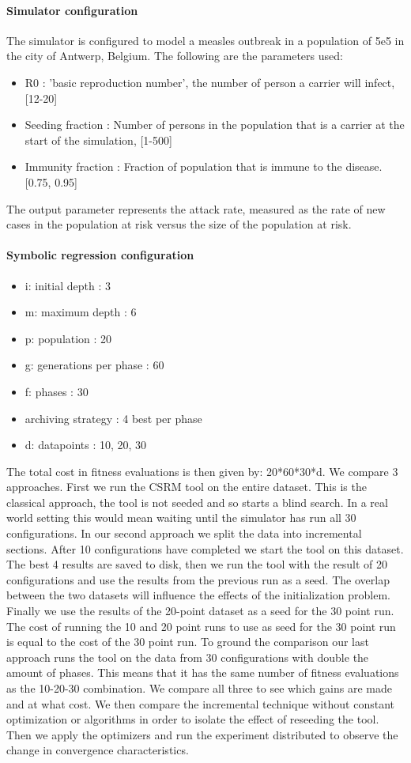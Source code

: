 \paragraph{Simulator configuration}
The simulator is configured to model a measles outbreak in a population of 5e5 in the city of Antwerp, Belgium. 
The following are the parameters used:
\begin{itemize}
\item R0 : 'basic reproduction number', the number of person a carrier will infect, [12-20]
\item Seeding fraction : Number of persons in the population that is a carrier at the start of the simulation, [1-500]
\item Immunity fraction : Fraction of population that is immune to the disease. [0.75, 0.95]
\end{itemize}
The output parameter represents the attack rate, measured as the rate of new cases in the population at risk versus the size of the population at risk.
\paragraph{Symbolic regression configuration}
\begin{itemize}
\item i: initial depth : 3
\item m: maximum depth : 6
\item p: population : 20
\item g: generations per phase : 60
\item f: phases : 30
\item archiving strategy : 4 best per phase
\item d: datapoints : 10, 20, 30
\end{itemize}
The total cost in fitness evaluations is then given by: 20*60*30*d.
We compare 3 approaches. First we run the CSRM tool on the entire dataset. This is the classical approach, the tool is not seeded and so starts a blind search. In a real world setting this would mean waiting until the simulator has run all 30 configurations.
In our second approach we split the data into incremental sections. After 10 configurations have completed we start the tool on this dataset. 
The best 4 results are saved to disk, then we run the tool with the result of 20 configurations and use the results from the previous run as a seed. The overlap between the two datasets will influence the effects of the initialization problem. Finally we use the results of the 20-point dataset as a seed for the 30 point run. 
The cost of running the 10 and 20 point runs to use as seed for the 30 point run is equal to the cost of the 30 point run. 
To ground the comparison our last approach runs the tool on the data from 30 configurations with double the amount of phases. This means that it has the same number of fitness evaluations as the 10-20-30 combination. We compare all three to see which gains are made and at what cost.
We then compare the incremental technique without constant optimization or algorithms in order to isolate the effect of reseeding the tool.
Then we apply the optimizers and run the experiment distributed to observe the change in convergence characteristics.
